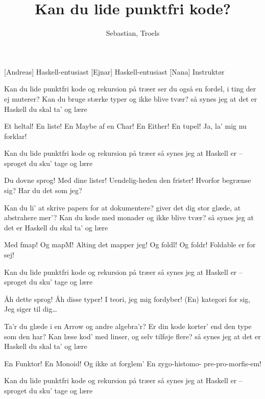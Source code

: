 \documentclass[a4paper,11pt]{article}
\title{Kan du lide punktfri kode?}
\author{Sebastian, Troels}
\begin{document}
\maketitle

\begin{roles}
[Andreas] Haskell-entusiast 
[Ejnar] Haskell-entusiast 
[Nana] Instruktør
\end{roles}

\begin{song}

    Kan du lide punktfri kode og rekursion på træer
              ser du også en fordel, i ting der ej muterer?
    Kan du bruge stærke typer og ikke blive tvær?
              så synes jeg at det er Haskell du skal ta' og lære

    Et heltal!  En liste!
    En Maybe af en Char!
    En Either!  En tupel!
    Ja, la' mig nu forklar!

    Kan du lide punktfri kode og rekursion på træer
              så synes jeg at Haskell er -- sproget du sku' tage og lære

    Du dovne sprog! Med dine lister!
              Uendelig-heden den frister!
    Hvorfor begrænse sig?
              Har du det som jeg?

    Kan du li' at skrive papers for at dokumentere?
    giver det dig stor glæde, at abstrahere mer'?
    Kan du kode med monader og ikke blive tvær?
    så synes jeg at det er Haskell du skal ta' og lære

    Med fmap! Og mapM!
    Alting det mapper jeg!
    Og foldl! Og foldr!
    Foldable er for sej!

    Kan du lide punktfri kode og rekursion på træer
              så synes jeg at Haskell er -- sproget du sku' tage og lære

    Åh dette sprog!  Åh disse typer!
    I teori, jeg mig fordyber!
    (En) kategori for sig,
    Jeg siger til dig\ldots

    Ta'r du glæde i en Arrow  og andre algebra'r?
    Er din kode korter' end den type som den har?
    Kan læse kod' med linser,  og selv tilføje flere?
    så synes jeg at det er Haskell du skal ta' og lære

    En Funktor!  En Monoid!
    Og ikke at forglem'
 En zygo-histomo-
              pre-pro-morfis-em!

 Kan du lide punktfri kode og rekursion på træer
              så synes jeg at Haskell er -- sproget du sku' tage og lære

\end{song}
\end{document}
